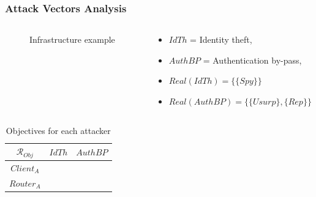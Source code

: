 \documentclass{beamer}
\newcommand{\cmark}{{\color{green}\ding{51}}}%
\newcommand{\xmark}{}%
\begin{document}
\begin{frame}
    \frametitle{Attack Vectors Analysis}

    \vspace{-2em}
    \begin{columns}[c]
        \hspace{.15em}
        \begin{column}{.5\textwidth}
            \begin{figure}[htb]
                \centering
                \resizebox{\textwidth}{!}{
                    
                }
                \vspace{-1.8em}
                \caption{Infrastructure example}
                \label{fig:ex_archi}
            \end{figure}
        \end{column}
        \begin{column}{.6\textwidth}
            \begin{itemize}
                \item $IdTh$ = Identity theft,
                \item $AuthBP$ = Authentication by-pass,
                \item $Real(IdTh) = \{ \{ Spy \} \}$
                \item $Real(AuthBP) = \{ \{ Usurp \}, \{ Rep \} \}$
            \end{itemize}
        \end{column}
    \end{columns}
    \begin{columns}[c]
        \hspace{.5em}
        \begin{column}{.45\textwidth}
            \begin{table}[htb]
                \centering
                \begin{tabular}{|c|c|c|}
                    \hline
                    $\mathcal{R}_{Obj}$ & $IdTh$   & $AuthBP$    \\
                    \hline
                    $Client_{A}$        & \xmark    & \cmark     \\
                    \hline
                    $Router_{A}$        & \cmark    & \xmark     \\
                    \hline
                \end{tabular}
                \caption{Objectives for each attacker}
                \label{tab:ex_robj}
            \end{table}

\end{column}
\end{columns}
\end{frame}
\end{document}
